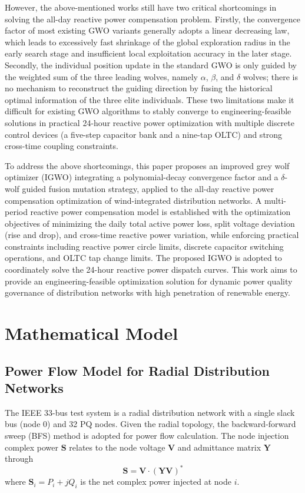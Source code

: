 However, the above-mentioned works still have two critical shortcomings in solving the all-day reactive power compensation problem. Firstly, the convergence factor of most existing GWO variants generally adopts a linear decreasing law, which leads to excessively fast shrinkage of the global exploration radius in the early search stage and insufficient local exploitation accuracy in the later stage. Secondly, the individual position update in the standard GWO is only guided by the weighted sum of the three leading wolves, namely $\alpha$, $\beta$, and $\delta$ wolves; there is no mechanism to reconstruct the guiding direction by fusing the historical optimal information of the three elite individuals. These two limitations make it difficult for existing GWO algorithms to stably converge to engineering-feasible solutions in practical 24-hour reactive power optimization with multiple discrete control devices (a five-step capacitor bank and a nine-tap OLTC) and strong cross-time coupling constraints.

To address the above shortcomings, this paper proposes an improved grey wolf optimizer (IGWO) integrating a polynomial-decay convergence factor and a $\delta$-wolf guided fusion mutation strategy, applied to the all-day reactive power compensation optimization of wind-integrated distribution networks. A multi-period reactive power compensation model is established with the optimization objectives of minimizing the daily total active power loss, split voltage deviation (rise and drop), and cross-time reactive power variation, while enforcing practical constraints including reactive power circle limits, discrete capacitor switching operations, and OLTC tap change limits. The proposed IGWO is adopted to coordinately solve the 24-hour reactive power dispatch curves. This work aims to provide an engineering-feasible optimization solution for dynamic power quality governance of distribution networks with high penetration of renewable energy.

\section{Mathematical Model}

\subsection{Power Flow Model for Radial Distribution Networks}

The IEEE 33-bus test system is a radial distribution network with a single slack bus (node 0) and 32 PQ nodes. Given the radial topology, the backward-forward sweep (BFS) method is adopted for power flow calculation. The node injection complex power $\boldsymbol{S}$ relates to the node voltage $\boldsymbol{V}$ and admittance matrix $\boldsymbol{Y}$ through
\begin{equation}
\boldsymbol{S} = \boldsymbol{V} \cdot \left(\boldsymbol{Y}\boldsymbol{V}\right)^*
\end{equation}
where $\boldsymbol{S}_i = P_i + jQ_i$ is the net complex power injected at node $i$.


